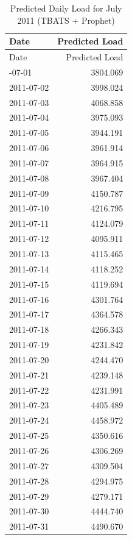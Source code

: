 \documentclass[
]{article}
\begin{document}
\begin{longtable}[]{@{}lr@{}}
\caption{Predicted Daily Load for July 2011 (TBATS +
Prophet)}\tabularnewline
\toprule\noalign{}
Date & Predicted Load \\
\midrule\noalign{}
\endfirsthead
\toprule\noalign{}
Date & Predicted Load \\
\midrule\noalign{}
\endhead
\bottomrule\noalign{}
\endlastfoot
2011-07-01 & 3804.069 \\
2011-07-02 & 3998.024 \\
2011-07-03 & 4068.858 \\
2011-07-04 & 3975.093 \\
2011-07-05 & 3944.191 \\
2011-07-06 & 3961.914 \\
2011-07-07 & 3964.915 \\
2011-07-08 & 3967.404 \\
2011-07-09 & 4150.787 \\
2011-07-10 & 4216.795 \\
2011-07-11 & 4124.079 \\
2011-07-12 & 4095.911 \\
2011-07-13 & 4115.465 \\
2011-07-14 & 4118.252 \\
2011-07-15 & 4119.694 \\
2011-07-16 & 4301.764 \\
2011-07-17 & 4364.578 \\
2011-07-18 & 4266.343 \\
2011-07-19 & 4231.842 \\
2011-07-20 & 4244.470 \\
2011-07-21 & 4239.148 \\
2011-07-22 & 4231.991 \\
2011-07-23 & 4405.489 \\
2011-07-24 & 4458.972 \\
2011-07-25 & 4350.616 \\
2011-07-26 & 4306.269 \\
2011-07-27 & 4309.504 \\
2011-07-28 & 4294.975 \\
2011-07-29 & 4279.171 \\
2011-07-30 & 4444.740 \\
2011-07-31 & 4490.670 \\
\end{longtable}
\end{document}
